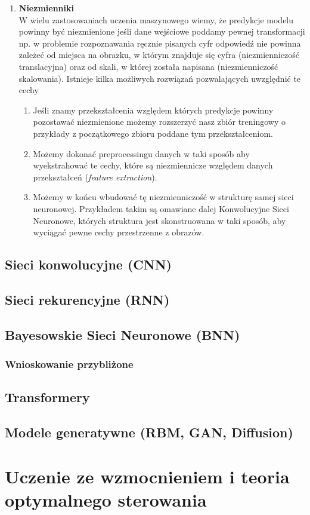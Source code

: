 \documentclass{myclass}
\begin{document}
\begin{enumerate}
    \item \textbf{Niezmienniki}\\
    W wielu zastosowaniach uczenia maszynowego wiemy, że predykcje modelu powinny być niezmienione
    jeśli dane wejściowe poddamy pewnej transformacji np. w problemie rozpoznawania ręcznie pisanych
    cyfr odpowiedź nie powinna zależeć od miejsca na obrazku, w którym znajduje się cyfra
    (niezmienniczość translacyjna) oraz od skali, w której została napisana (niezmienniczość
    skalowania). Istnieje kilka możliwych rozwiązań pozwalających uwzględnić te cechy
    \begin{enumerate}
        \item Jeśli znamy przekształcenia względem których predykcje powinny pozostawać niezmienione
        możemy rozszerzyć nasz zbiór treningowy o przykłady z początkowego zbioru poddane tym
        przekształceniom.

        \item Możemy dokonać preprocessingu danych w taki sposób aby wyekstrahować te cechy, które
        są niezmiennicze względem danych przekształceń (\textit{feature extraction}).

        \item Możemy w końcu wbudować tę niezmienniczość w strukturę samej sieci neuronowej.
        Przykładem takim są omawiane dalej Konwolucyjne Sieci Neuronowe, których struktura jest
        skonstruowana w taki sposób, aby wyciągać pewne cechy przestrzenne z obrazów.
    \end{enumerate}
\end{enumerate}


\subsection{Sieci konwolucyjne (CNN)}

\subsection{Sieci rekurencyjne (RNN)}

\subsection{Bayesowskie Sieci Neuronowe (BNN)}

\subsubsection{Wnioskowanie przybliżone}



\subsection{Transformery}

\subsection{Modele generatywne (RBM, GAN, Diffusion)}


\section{Uczenie ze wzmocnieniem i teoria optymalnego sterowania}
\end{document}
